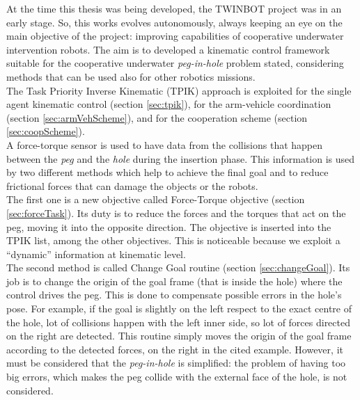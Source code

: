 At the time this thesis was being developed, the TWINBOT project was in an early stage. So, this works evolves autonomously, always keeping an eye on the main objective of the project: improving capabilities of cooperative underwater intervention robots. The aim  is to developed a kinematic control framework suitable for the cooperative underwater \textit{peg-in-hole} problem stated, considering methods that can be used also for other robotics missions.\\
The Task Priority Inverse Kinematic (TPIK) approach is exploited for the single agent kinematic control (section \ref{sec:tpik}), for the arm-vehicle coordination (section \ref{sec:armVehScheme}), and for the cooperation scheme (section \ref{sec:coopScheme}).\\
A force-torque sensor is used to have data from the collisions that happen between the \textit{peg} and the \textit{hole} during the insertion phase. This information is used by two different methods which help to achieve the final goal and to reduce frictional forces that can damage the objects or the robots.\\
The first one is a new objective called Force-Torque objective (section \ref{sec:forceTask}). Its duty is to reduce the forces and the torques that act on the peg, moving it into the opposite direction. The objective is inserted into the TPIK list, among the other objectives. This is noticeable because we exploit a \enquote{dynamic} information at kinematic level.\\
The second method is called Change Goal routine (section \ref{sec:changeGoal}). Its job is to change the origin of the goal frame (that is inside the hole) where the control drives the peg. This is done to compensate possible errors in the hole's pose. For example, if the goal is slightly on the left respect to the exact centre of the hole, lot of collisions happen with the left inner side, so lot of forces directed on the right are detected. This routine simply moves the origin of the goal frame according to the detected forces, on the right in the cited example. 
However, it must be considered that the \textit{peg-in-hole} is simplified: the problem of having too big errors, which makes the peg collide with the external face of the hole, is not considered.


